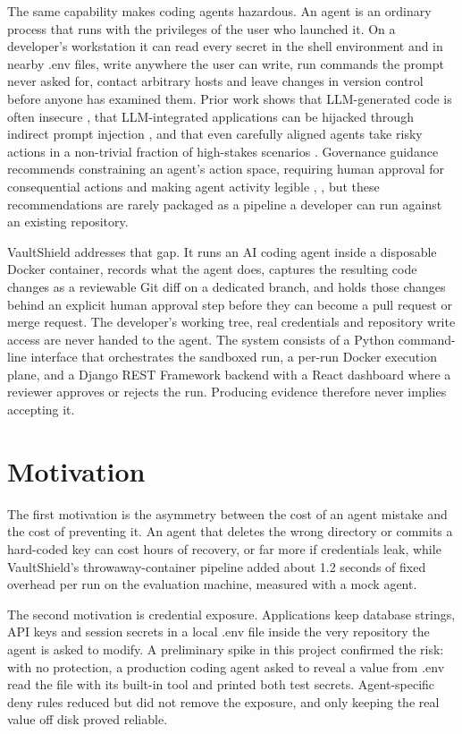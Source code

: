 \documentclass[12pt,a4paper,oneside]{report}
\begin{document}
The same capability makes coding agents hazardous. An agent is an ordinary process that runs with the privileges of the user who launched it. On a developer's workstation it can read every secret in the shell environment and in nearby .env files, write anywhere the user can write, run commands the prompt never asked for, contact arbitrary hosts and leave changes in version control before anyone has examined them. Prior work shows that LLM-generated code is often insecure \cite{ref8}, that LLM-integrated applications can be hijacked through indirect prompt injection \cite{ref7}, and that even carefully aligned agents take risky actions in a non-trivial fraction of high-stakes scenarios \cite{ref5}. Governance guidance recommends constraining an agent's action space, requiring human approval for consequential actions and making agent activity legible \cite{ref9}, \cite{ref10}, but these recommendations are rarely packaged as a pipeline a developer can run against an existing repository.

VaultShield addresses that gap. It runs an AI coding agent inside a disposable Docker container, records what the agent does, captures the resulting code changes as a reviewable Git diff on a dedicated branch, and holds those changes behind an explicit human approval step before they can become a pull request or merge request. The developer's working tree, real credentials and repository write access are never handed to the agent. The system consists of a Python command-line interface that orchestrates the sandboxed run, a per-run Docker execution plane, and a Django REST Framework backend with a React dashboard where a reviewer approves or rejects the run. Producing evidence therefore never implies accepting it.

\section{Motivation}\label{motivation}

The first motivation is the asymmetry between the cost of an agent mistake and the cost of preventing it. An agent that deletes the wrong directory or commits a hard-coded key can cost hours of recovery, or far more if credentials leak, while VaultShield's throwaway-container pipeline added about 1.2 seconds of fixed overhead per run on the evaluation machine, measured with a mock agent.

The second motivation is credential exposure. Applications keep database strings, API keys and session secrets in a local .env file inside the very repository the agent is asked to modify. A preliminary spike in this project confirmed the risk: with no protection, a production coding agent asked to reveal a value from .env read the file with its built-in tool and printed both test secrets. Agent-specific deny rules reduced but did not remove the exposure, and only keeping the real value off disk proved reliable.
\end{document}
